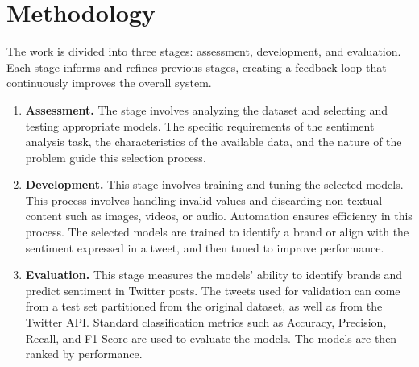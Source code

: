 \documentclass{article}
\begin{document}
\section*{Methodology}

The work is divided into three stages: assessment, development, and
evaluation. Each stage informs and refines previous stages, creating a feedback
loop that continuously improves the overall system.

\begin{enumerate}[leftmargin=*]

    \item \textbf{Assessment.} The stage involves analyzing the dataset and selecting and testing
          appropriate models. The specific requirements of the
          sentiment
          analysis task, the characteristics of the available data, and the
          nature of the
          problem guide this selection process.

    \item \textbf{Development.} This stage involves training and tuning the selected models. This process involves
          handling
          invalid values and discarding non-textual content such as images,
          videos, or
          audio. Automation ensures efficiency in this process. The selected
          models are
          trained to identify a
          brand or
          align with the sentiment expressed in a tweet, and then tuned to improve performance.

    \item \textbf{Evaluation.} This stage measures the models' ability to
          identify brands and predict sentiment in Twitter posts. The tweets used for validation can come 	  from a test set partitioned from the original dataset, as well as from the Twitter API.
          Standard classification metrics such as Accuracy, Precision, Recall,
          and F1
          Score are used to evaluate the models. The models are then ranked by
          performance.

\end{enumerate}
\end{document}

